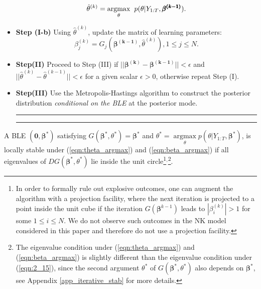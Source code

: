 \begin{table}[!htbp]
\begin{itemize}
\begin{equation}
\hat{\theta}^{(k)}=\underset{\theta}{\operatorname{argmax}} \hspace{2 mm} p(\theta|Y_{1:T},\pmb{\beta^{(k-1)}}).
\label{eqn:theta_argmax}
\end{equation}
\item \textbf{Step (I-b)} Using $\hat{\theta}^{(k)}$, update the matrix of learning parameters:
\begin{equation}
{\beta_j^{(k)}}= G_j(\pmb{ \beta^{(k-1)}}, \hat{\theta}^{(k)}), 1 \leq j \leq N.
\label{eqn:beta_argmax}
\end{equation}
\item \textbf{Step(II)} Proceed to Step (III) if  $||\pmb{ \beta^{(k)}} - \pmb{ \beta^{(k-1)}} || <\epsilon $ and $||\hat{\theta}^{(k)} - \hat{\theta}^{(k-1)} || <\epsilon $ for a given scalar $\epsilon>0$, otherwise repeat Step (I).
\item \textbf{Step(III)} Use the Metropolis-Hastings algorithm to construct the posterior distribution \textit{conditional on the BLE} at the posterior mode. \\
\vspace{1.5 mm}
\hrule
\hrule
\end{itemize}
\end{table}

\FloatBarrier

A BLE $(\pmb{0},\pmb{\beta^{*}})$ satisfying $G(\pmb{\beta^{*}},\theta^{*})=\pmb{\beta^{*}}$ and  ${\theta}^{*}=\underset{\theta}{\operatorname{argmax}} p(\theta|Y_{1:T},\pmb{\beta^{*}}) $, is locally stable under (\ref{eqn:theta_argmax}) and (\ref{eqn:beta_argmax}) if all eigenvalues of $DG(\pmb{ \beta}^{*},{ \theta}^{*})$ lie inside the unit circle\footnote{ In order to formally rule out explosive outcomes, one can augment the algorithm with a projection facility, where the next iteration is projected to a point inside the unit cube if the iteration $G(\pmb{ \beta}^{k-1}) $ leads to $|\beta^{(k)}_i|>1$ for some $ 1 \leq  i \leq N $. We do not observe such outcomes in the NK model considered in this paper and therefore do not use a projection facility.}$^{,}$\footnote{The eigenvalue condition under (\ref{eqn:theta_argmax}) and (\ref{eqn:beta_argmax}) is slightly different than the eigenvalue condition under (\ref{eqn:2_15}), since the second argument $\theta^{*}$ of $G(\pmb{\beta^{*}},\theta^{*})$ also depends on $\pmb{\beta^{*}}$, see Appendix \ref{app_iterative_stab} for more details.}.


